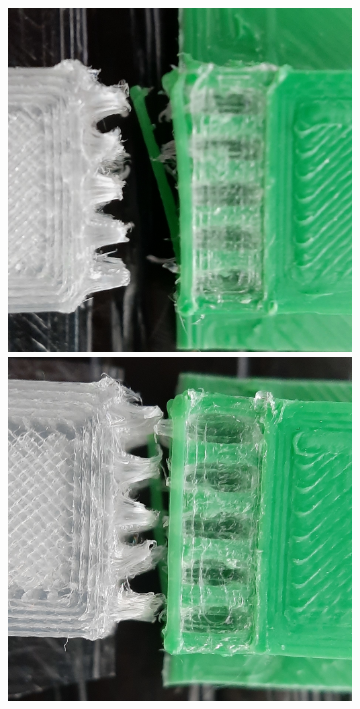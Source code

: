 \begin{figure}
\begin{subfigure}[B]{.99\columnwidth}
		\includegraphics[width=\figwidth]{sources-testing-j3_cropped.jpg}
		\includegraphics[width=\figwidth]{sources-testing-j4_cropped.jpg}

\end{subfigure}
\end{figure}

